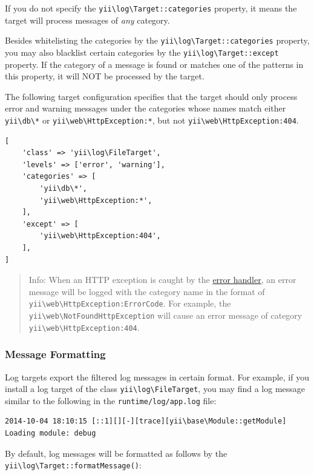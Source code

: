 If you do not specify the \texttt{yii{\allowbreak{}\textbackslash}log{\allowbreak{}\textbackslash}Target\allowbreak{}::\allowbreak{}categories} property, it means the target will process
messages of \textit{any} category.

Besides whitelisting the categories by the \texttt{yii{\allowbreak{}\textbackslash}log{\allowbreak{}\textbackslash}Target\allowbreak{}::\allowbreak{}categories} property, you may also
blacklist certain categories by the \texttt{yii{\allowbreak{}\textbackslash}log{\allowbreak{}\textbackslash}Target\allowbreak{}::\allowbreak{}except} property. If the category of a message
is found or matches one of the patterns in this property, it will NOT be processed by the target.

The following target configuration specifies that the target should only process error and warning messages
under the categories whose names match either \lstinline|yii\db\*| or \lstinline|yii\web\HttpException:*|, but not \lstinline|yii\web\HttpException:404|.

\lstset{language=php}\begin{lstlisting}
[
    'class' => 'yii\log\FileTarget',
    'levels' => ['error', 'warning'],
    'categories' => [
        'yii\db\*',
        'yii\web\HttpException:*',
    ],
    'except' => [
        'yii\web\HttpException:404',
    ],
]
\end{lstlisting}
\begin{quote}Info: When an HTTP exception is caught by the \hyperref[runtime-handling-errors.md]{error handler}, an error message
  will be logged with the category name in the format of \lstinline|yii\web\HttpException:ErrorCode|. For example,
  the \texttt{yii{\allowbreak{}\textbackslash}web{\allowbreak{}\textbackslash}NotFoundHttpException} will cause an error message of category \lstinline|yii\web\HttpException:404|.

\end{quote}
\subsubsection{Message Formatting \label{runtime-logging.md::message-formatting}}
Log targets export the filtered log messages in certain format. For example, if you install
a log target of the class \texttt{yii{\allowbreak{}\textbackslash}log{\allowbreak{}\textbackslash}FileTarget}, you may find a log message similar to the following in the
\lstinline|runtime/log/app.log| file:

\begin{lstlisting}
2014-10-04 18:10:15 [::1][][-][trace][yii\base\Module::getModule] Loading module: debug
\end{lstlisting}
By default, log messages will be formatted as follows by the \texttt{yii{\allowbreak{}\textbackslash}log{\allowbreak{}\textbackslash}Target\allowbreak{}::\allowbreak{}formatMessage()}:

